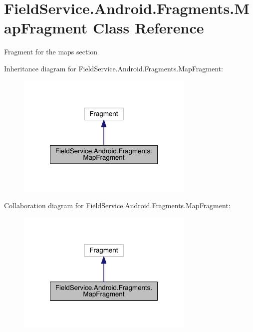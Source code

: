 \hypertarget{class_field_service_1_1_android_1_1_fragments_1_1_map_fragment}{\section{Field\+Service.\+Android.\+Fragments.\+Map\+Fragment Class Reference}
\label{class_field_service_1_1_android_1_1_fragments_1_1_map_fragment}
}


Fragment for the maps section  




Inheritance diagram for Field\+Service.\+Android.\+Fragments.\+Map\+Fragment\+:
\nopagebreak
\begin{figure}[H]
\begin{center}
\leavevmode
\includegraphics[width=240pt]{class_field_service_1_1_android_1_1_fragments_1_1_map_fragment__inherit__graph}
\end{center}
\end{figure}


Collaboration diagram for Field\+Service.\+Android.\+Fragments.\+Map\+Fragment\+:
\nopagebreak
\begin{figure}[H]
\begin{center}
\leavevmode
\includegraphics[width=240pt]{class_field_service_1_1_android_1_1_fragments_1_1_map_fragment__coll__graph}
\end{center}
\end{figure}
